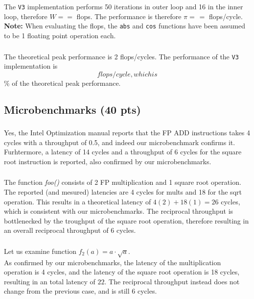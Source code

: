 \subsubsection{} %
The \texttt{V3} implementation performs 50 iterations in outer loop and 16 in the inner loop, therefore $W = = $ flops. The performance is therefore $\pi = \frac{}{} = $ flops/cycle. \textbf{Note:} When evaluating the flops, the \texttt{abs} and \texttt{cos} functions have been assumed to be 1 floating point operation each.
\subsubsection{} %
The theoretical peak performance is 2 flops/cycles. The performance of the \texttt{V3} implementation is $$ flops/cycle, which is $$\% of the theoretical peak performance.

\subsection{Microbenchmarks (40 pts)}
\subsubsection{} %
Yes, the Intel Optimization manual reports that the FP ADD instructions takes 4 cycles with a throughput of 0.5, and indeed our microbenchmark confirms it.\\
Furhtermore, a latency of 14 cycles and a throughput of 6 cycles for the square root instruction is reported, also confirmed by our microbenchmarks.
\subsubsection{} %
The function \textit{foo()} consists of 2 FP multiplication and 1 square root operation. The reported (and mesured) latencies are 4 cycles for mults and 18 for the sqrt operation. This results in a theoretical latency of $4(2)+18(1)=26$ cycles, which is consistent with our microbenchmarks. The reciprocal throughput is bottlenecked by the troughput of the square root operation, therefore resulting in an overall reciprocal throughput of 6 cycles.
\subsubsection{} %
Let us examine function $f_2(a) = a \cdot \sqrt{a}$.\\
As confirmed by our microbenchmarks, the latency of the multiplication operation is 4 cycles, and the latency of the square root operation is 18 cycles, resulting in an total latency of $22$. The reciprocal throughput instead does not change from the previous case, and is still 6 cycles.